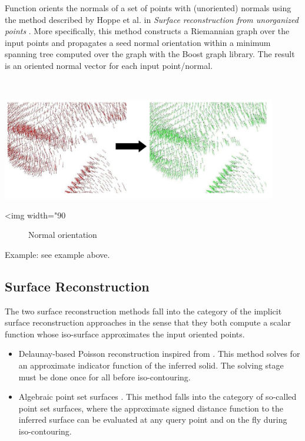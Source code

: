 Function  orients the normals of a set of points with (unoriented) normals
using the method described by Hoppe et al. in {\em Surface reconstruction from unorganized points} \cite{cgal:hddms-srup-92}.
More specifically, this method constructs a Riemannian graph over the input points and
propagates a seed normal orientation within a minimum spanning tree computed over the graph with the Boost graph library.
The result is an oriented normal vector for each input point/normal.

  \\

\begin{center}
    \label{Surface_reconstruction_3-fig-mst_normal_orientation}
    \begin{ccTexOnly}
        \includegraphics[width=0.9\textwidth]{Surface_reconstruction_3/mst_normal_orientation} %
    \end{ccTexOnly}
    \begin{ccHtmlOnly}
        <img width="90%
    \end{ccHtmlOnly}
    \begin{figure}[h]
        \caption{Normal orientation}
    \end{figure}
\end{center}

Example: see  example above.

\subsection{Surface Reconstruction}

The two surface reconstruction methods fall into the category of the implicit surface reconstruction approaches in the sense that they both compute a scalar function whose iso-surface approximates the input oriented points.
\begin{itemize}
\item Delaunay-based Poisson reconstruction inspired
      from \cite{Kazhdan06}. This method solves for
      an approximate indicator function of the inferred
      solid. The solving stage must be done once for all
      before iso-contouring. %
\item Algebraic point set surfaces \cite{Guennebaud07}.
      This method falls into the category of so-called
      point set surfaces, where the approximate
      signed distance function to the inferred surface
      can be evaluated at any query point and on the fly
      during iso-contouring.
\end{itemize}

